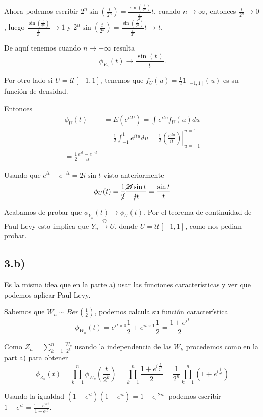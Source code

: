 \documentclass[a4paper,10pt]{article}
\begin{document}
Ahora podemos escribir $2^n \sin\left(\frac{t}{2^{n}}\right) 
= \frac{\sin\left(\frac{t}{2^{n}}\right)}{\frac{t}{2^n}}t$,
cuando $n \rightarrow \infty$, entonces $\frac{t}{2^{n}} \rightarrow 0$, luego
$\frac{\sin\left(\frac{t}{2^{n}}\right)}{\frac{t}{2^n}} \rightarrow 1$ y 
$2^n \sin\left(\frac{t}{2^{n}}\right) 
= \frac{\sin\left(\frac{t}{2^{n}}\right)}{\frac{t}{2^n}}t \rightarrow t$.

De aquí tenemos cuando $n \rightarrow +\infty$ resulta
\[\phi_{Y_n}(t) \rightarrow \frac{\sin(t)}{t}.\]

Por otro lado si $U = \mathcal U[-1,1]$, tenemos que 
$f_U(u) = \frac{1}{2} 1_{[-1,1]}(u)$ es su función de densidad.

Entonces 
\[
\begin{align*}
\phi_U(t) &= E(e^{itU}) = \int e^{itu} f_U(u) du \\
&= \frac{1}{2} \int_{-1}^{1} e^{itu} du 
= \frac{1}{2} \left.\left(\frac{e^{itu}}{it}\right)\right|_{u=-1}^{u=1} \\
= \frac{1}{2} \frac{e^{it} - e^{-it}}{it}
\end{align*}
\]

Usando que $e^{it} - e^{-it} = 2i\sin t$ visto anteriormente
\[ \phi_U(t) = \frac{1}{\cancel{2}} \frac{\cancel{2i}\sin t}{\cancel{i}t} 
= \frac{\sin t}{t} \]

Acabamos de probar que $\phi_{Y_n}(t) \rightarrow \phi_U(t)$.
Por el teorema de continuidad de Paul Levy esto implica que
$Y_n \overset{\mathcal D}{\rightarrow} U$,
donde $U = \mathcal U[-1, 1]$, como nos pedian probar.

\subsection*{3.b)}

Es la misma idea que en la parte a) usar las funciones características y ver que podemos
aplicar Paul Levy.

Sabemos que $W_n \sim Ber(\frac{1}{2})$, podemos calcula su función característica
\[ \phi_{W_n}(t) = e^{it \times 0}\frac{1}{2} + e^{it\times 1}\frac{1}{2} 
= \frac{1 + e^{it}}{2} \]

Como $Z_n = \sum_{k=1}^n \frac{W_k}{2^k}$ usando la independencia de las $W_k$ 
procedemos como en la part a) para obtener
\[
\phi_{Z_n}(t) = \prod_{k=1}^n \phi_{W_k}(\frac{t}{2^k}) 
= \prod_{k=1}^n \frac{1 + e^{i\frac{t}{2^k}}}{2}
= \frac{1}{2^n} \prod_{k=1}^n (1 + e^{i\frac{t}{2^k}})
\]

Usando la igualdad $(1 + e^{it})(1 - e^{it}) = 1 - ẹ^{2it}$ podemos escribir 
$1 + e^{it} = \frac{1 - e^{2it}}{1 - e^{it}}$.
\end{document}
